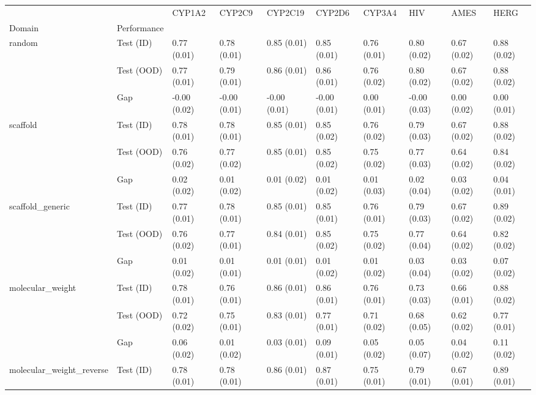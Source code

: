 \begin{tabular}{llllllllll}
\toprule
 &  & CYP1A2 & CYP2C9 & CYP2C19 & CYP2D6 & CYP3A4 & HIV & AMES & HERG \\
Domain & Performance &  &  &  &  &  &  &  &  \\
\midrule
\multirow[t]{3}{*}{random} & Test (ID) & 0.77 (0.01) & 0.78 (0.01) & 0.85 (0.01) & 0.85 (0.01) & 0.76 (0.01) & 0.80 (0.02) & 0.67 (0.02) & 0.88 (0.02) \\
 & Test (OOD) & 0.77 (0.01) & 0.79 (0.01) & 0.86 (0.01) & 0.86 (0.01) & 0.76 (0.02) & 0.80 (0.02) & 0.67 (0.02) & 0.88 (0.02) \\
 & Gap & -0.00 (0.02) & -0.00 (0.01) & -0.00 (0.01) & -0.00 (0.01) & 0.00 (0.01) & -0.00 (0.03) & 0.00 (0.02) & 0.00 (0.01) \\
\cline{1-10}
\multirow[t]{3}{*}{scaffold} & Test (ID) & 0.78 (0.01) & 0.78 (0.01) & 0.85 (0.01) & 0.85 (0.02) & 0.76 (0.02) & 0.79 (0.03) & 0.67 (0.02) & 0.88 (0.02) \\
 & Test (OOD) & 0.76 (0.02) & 0.77 (0.02) & 0.85 (0.01) & 0.85 (0.02) & 0.75 (0.02) & 0.77 (0.03) & 0.64 (0.02) & 0.84 (0.02) \\
 & Gap & 0.02 (0.02) & 0.01 (0.02) & 0.01 (0.02) & 0.01 (0.02) & 0.01 (0.03) & 0.02 (0.04) & 0.03 (0.02) & 0.04 (0.01) \\
\cline{1-10}
\multirow[t]{3}{*}{scaffold_generic} & Test (ID) & 0.77 (0.01) & 0.78 (0.01) & 0.85 (0.01) & 0.85 (0.01) & 0.76 (0.01) & 0.79 (0.03) & 0.67 (0.02) & 0.89 (0.02) \\
 & Test (OOD) & 0.76 (0.02) & 0.77 (0.01) & 0.84 (0.01) & 0.85 (0.02) & 0.75 (0.02) & 0.77 (0.04) & 0.64 (0.02) & 0.82 (0.02) \\
 & Gap & 0.01 (0.02) & 0.01 (0.01) & 0.01 (0.01) & 0.01 (0.02) & 0.01 (0.02) & 0.03 (0.04) & 0.03 (0.02) & 0.07 (0.02) \\
\cline{1-10}
\multirow[t]{3}{*}{molecular_weight} & Test (ID) & 0.78 (0.01) & 0.76 (0.01) & 0.86 (0.01) & 0.86 (0.01) & 0.76 (0.01) & 0.73 (0.03) & 0.66 (0.01) & 0.88 (0.02) \\
 & Test (OOD) & 0.72 (0.02) & 0.75 (0.01) & 0.83 (0.01) & 0.77 (0.01) & 0.71 (0.02) & 0.68 (0.05) & 0.62 (0.02) & 0.77 (0.01) \\
 & Gap & 0.06 (0.02) & 0.01 (0.02) & 0.03 (0.01) & 0.09 (0.01) & 0.05 (0.02) & 0.05 (0.07) & 0.04 (0.02) & 0.11 (0.02) \\
\cline{1-10}
\multirow[t]{3}{*}{molecular_weight_reverse} & Test (ID) & 0.78 (0.01) & 0.78 (0.01) & 0.86 (0.01) & 0.87 (0.01) & 0.75 (0.01) & 0.79 (0.01) & 0.67 (0.01) & 0.89 (0.01) \\

\end{tabular}
